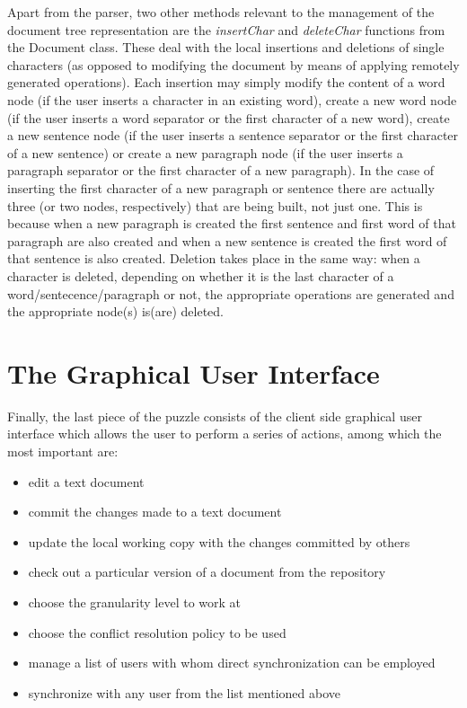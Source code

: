 Apart from the parser, two other methods relevant to the management of the document
tree representation are the \emph{insertChar} and \emph{deleteChar} functions from
the Document class. These deal with the local insertions and deletions of single characters
(as opposed to modifying the document by means of applying remotely generated operations).
Each insertion may simply modify the content of a word node (if the user inserts a
character in an existing word), create a new word node (if the user inserts a word
separator or the first character of a new word), create a new sentence node (if the
user inserts a sentence separator or the first character of a new sentence) or create
a new paragraph node (if the user inserts a paragraph separator or the first character
of a new paragraph). In the case of inserting the first character of a new paragraph
or sentence there are actually three (or two nodes, respectively) that are being built,
not just one. This is because when a new paragraph is created the first sentence and first word of
that paragraph are also created and when a new sentence is created the first word of that
sentence is also created. Deletion takes place in the same way: when a character is
deleted, depending on whether it is the last character of a word/sentecence/paragraph
or not, the appropriate operations are generated and the appropriate node(s) is(are)
deleted.

\section{The Graphical User Interface}

Finally, the last piece of the puzzle consists of the client side graphical user interface
which allows the user to perform a series of actions, among which the most important are:

\begin{itemize}

\item edit a text document
\item commit the changes made to a text document
\item update the local working copy with the changes committed by others
\item check out a particular version of a document from the repository
\item choose the granularity level to work at
\item choose the conflict resolution policy to be used
\item manage a list of users with whom direct synchronization can be employed
\item synchronize with any user from the list mentioned above

\end{itemize}

